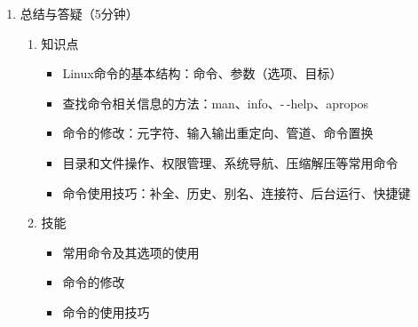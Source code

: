 \documentclass{TIJMUjiaoanLL}
\begin{document}
\begin{enumerate}
  \item 总结与答疑（5分钟）
    \begin{enumerate}
      \item 知识点
	\begin{itemize}
	  \item Linux命令的基本结构：命令、参数（选项、目标）
	  \item 查找命令相关信息的方法：man、info、-\,-help、apropos
          \item 命令的修改：元字符、输入输出重定向、管道、命令置换
          \item 目录和文件操作、权限管理、系统导航、压缩解压等常用命令
          \item 命令使用技巧：补全、历史、别名、连接符、后台运行、快捷键
	\end{itemize}
      \item 技能
	\begin{itemize}
          \item 常用命令及其选项的使用
          \item 命令的修改
          \item 命令的使用技巧
	\end{itemize}
    \end{enumerate}

\end{enumerate}

\otherTail
\end{document}
